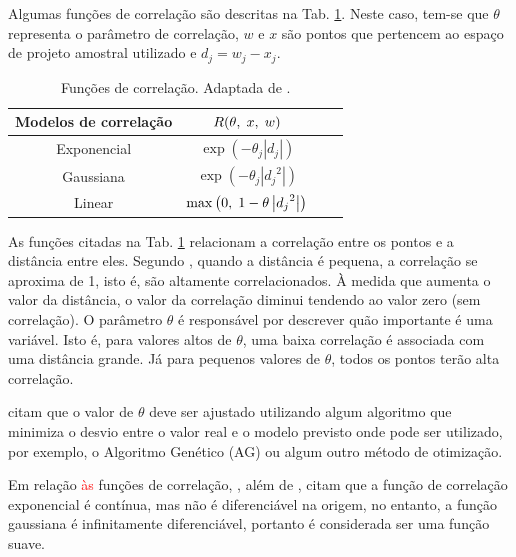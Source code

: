 Algumas funções de correlação são descritas na Tab. \ref{func}. Neste caso, tem-se que $\theta$ representa o parâmetro de correlação, $w$ e $x$ são pontos que pertencem ao espaço de projeto amostral utilizado e ${d}_j={w}_j-{x}_j$.

\begin{table}[H]
	\caption{Funções de correlação. Adaptada de .} \label{func} 
	\centering
	\begin{tabular}{c c c c}
		\hline
			Modelos de correlação & $ R(\theta,\hspace{0.1 cm}x,\hspace{0.1 cm}w) $ \\ [7pt] 
		\hline	
		Exponencial & $ \exp{\left(-\theta_j\left|{d_j}\right|\right)} $\\ [7pt]
		Gaussiana &  $\exp{\left(-\theta_j \left|{d_j}^2\right|\right)}$ \\ [7pt] 
		Linear & $\max\left(0,\hspace{0.1 cm}1-{\theta}\left|{d_j}^2\right|\right)$ \\ [7pt]
		\hline
	\end{tabular}
\end{table}

As funções citadas na Tab. \ref{func} relacionam a correlação entre os pontos e a distância entre eles. Segundo , quando a distância é pequena, a correlação se aproxima de 1, isto é, são altamente correlacionados. À medida que aumenta o valor da distância, o valor da correlação diminui tendendo ao valor zero (sem correlação). O parâmetro $\theta$ é responsável por descrever quão importante é uma variável. Isto é, para valores altos de $\theta$, uma baixa correlação é associada com uma distância {\color{red}grande}. Já para pequenos valores de $\theta$, todos os pontos terão alta correlação.

 citam que o valor de $\theta$ deve ser ajustado utilizando algum algoritmo que minimiza o desvio entre o valor real e o modelo previsto onde pode ser utilizado, por exemplo, o Algoritmo Genético (AG) ou algum outro método de otimização.
 
Em relação \textcolor{red}{às} funções de correlação, , além de , citam que a função de correlação exponencial é contínua, mas não é diferenciável na origem, no entanto, a função gaussiana é infinitamente diferenciável, portanto é considerada ser uma função suave. 

